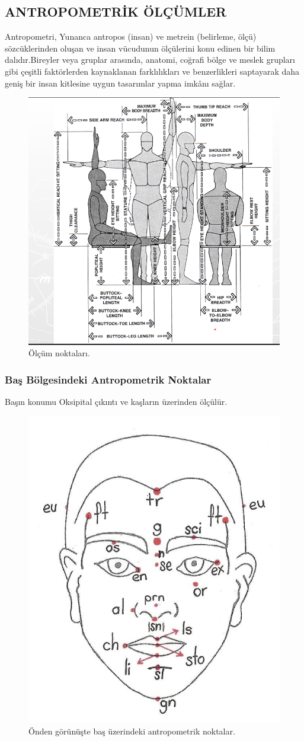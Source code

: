 \documentclass[12pt, a4paper]{article}
\begin{document}
\subsection{ANTROPOMETRİK ÖLÇÜMLER}
Antropometri, Yunanca antropos (insan) ve metrein (belirleme, ölçü) sözcüklerinden oluşan ve insan vücudunun ölçülerini konu edinen bir bilim dalıdır.Bireyler veya gruplar arasında, anatomi, coğrafi bölge ve meslek grupları gibi çeşitli faktörlerden kaynaklanan farklılıkları ve benzerlikleri saptayarak daha geniş bir insan kitlesine uygun tasarımlar yapma imkânı sağlar.
\begin{figure}[h] 
	\centering
	\includegraphics[width=8 cm , height = 7 cm ]{ant.png}
	\caption{Ölçüm noktaları.}
\end{figure}
\subsubsection{Baş Bölgesindeki Antropometrik Noktalar}
Başın konumu Oksipital çıkıntı ve kaşların üzerinden ölçülür.
\begin{figure}[h] 
	\centering
	\includegraphics[width=8 cm , height = 5 cm ]{bas.png}
	\caption{ Önden görünüşte baş üzerindeki antropometrik noktalar.}
\end{figure}
\pagebreak
\end{document}
